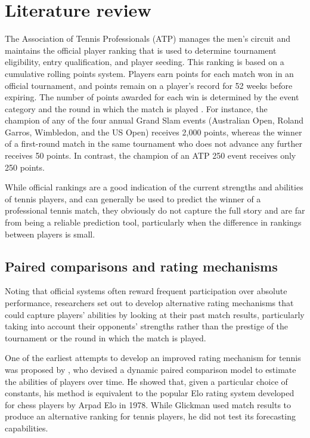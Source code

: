 \pagebreak


\section{Literature review}
\label{sec:literature-review}

The Association of Tennis Professionals (ATP) manages the men's circuit and maintains the official
player ranking that is used to determine tournament eligibility, entry qualification, and player
seeding. This ranking is based on a cumulative rolling points system. Players earn points for each
match won in an official tournament, and points remain on a player's record for 52 weeks before
expiring. The number of points awarded for each win is determined by the event category and the
round in which the match is played \parencite{williams_2021}. For instance, the champion of any of the
four annual Grand Slam events (Australian Open, Roland Garros, Wimbledon, and the US Open) receives
2,000 points, whereas the winner of a first-round match in the same tournament who does not advance
any further receives 50 points. In contrast, the champion of an ATP 250 event receives only 250
points.

While official rankings are a good indication of the current strengths and abilities of
tennis players, and can generally be used to predict the winner of a professional tennis match,
they obviously do not capture the full story and are far from being a reliable prediction tool,
particularly when the difference in rankings between players is small.

\subsection{Paired comparisons and rating mechanisms}

Noting that official systems often reward frequent participation over absolute performance,
researchers set out to develop alternative rating mechanisms that could capture players' abilities
by looking at their past match results, particularly taking into account their opponents' strengths
rather than the prestige of the tournament or the round in which the match is played.

One of the earliest attempts to develop an improved rating mechanism for tennis was proposed by
\textcite{glickman_1999}, who devised a dynamic paired comparison model to estimate the abilities of
players over time. He showed that, given a particular choice of constants, his method is equivalent
to the popular Elo rating system developed for chess players by Arpad Elo in 1978. While Glickman
used match results to produce an alternative ranking for tennis players, he did not test its
forecasting capabilities.

